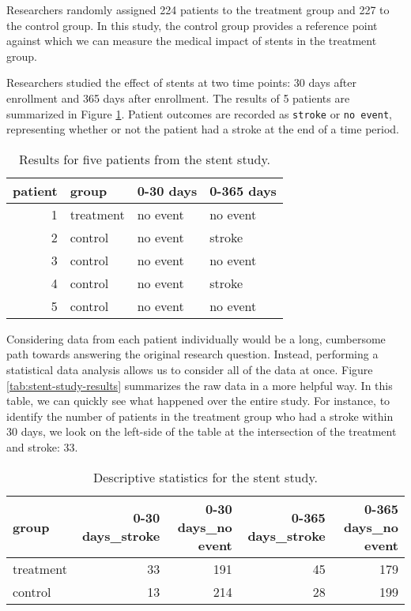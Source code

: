 \documentclass[]{book}
\begin{document}
Researchers randomly assigned 224 patients to the treatment group and 227 to the control group.
In this study, the control group provides a reference point against which we can measure the medical impact of stents in the treatment group.

Researchers studied the effect of stents at two time points: 30 days after enrollment and 365 days after enrollment. The results of 5 patients are summarized in Figure \ref{tab:stent-study-results-df}.
Patient outcomes are recorded as \texttt{stroke} or \texttt{no\ event}, representing whether or not the patient had a stroke at the end of a time period.

\begin{table}

\caption{\label{tab:stent-study-results-df}Results for five patients from the stent study.}
\centering
\begin{tabular}[t]{r|l|l|l}
\hline
patient & group & 0-30 days & 0-365 days\\
\hline
1 & treatment & no event & no event\\
\hline
2 & control & no event & stroke\\
\hline
3 & control & no event & no event\\
\hline
4 & control & no event & stroke\\
\hline
5 & control & no event & no event\\
\hline
\end{tabular}
\end{table}

Considering data from each patient individually would be a long, cumbersome path towards answering the original research question. Instead, performing a statistical data analysis allows us to consider all of the data at once. Figure \ref{tab:stent-study-results} summarizes the raw data in a more helpful way. In this table, we can quickly see what happened over the entire study. For instance, to identify the number of patients in the treatment group who had a stroke within 30 days, we look on the left-side of the table at the intersection of the treatment and stroke: 33.

\begin{table}

\caption{\label{tab:unnamed-chunk-4}Descriptive statistics for the stent study.}
\centering
\begin{tabular}[t]{l|r|r|r|r}
\hline
group & 0-30 days\_stroke & 0-30 days\_no event & 0-365 days\_stroke & 0-365 days\_no event\\
\hline
treatment & 33 & 191 & 45 & 179\\
\hline
control & 13 & 214 & 28 & 199\\
\hline
\end{tabular}
\end{table}
\end{document}

